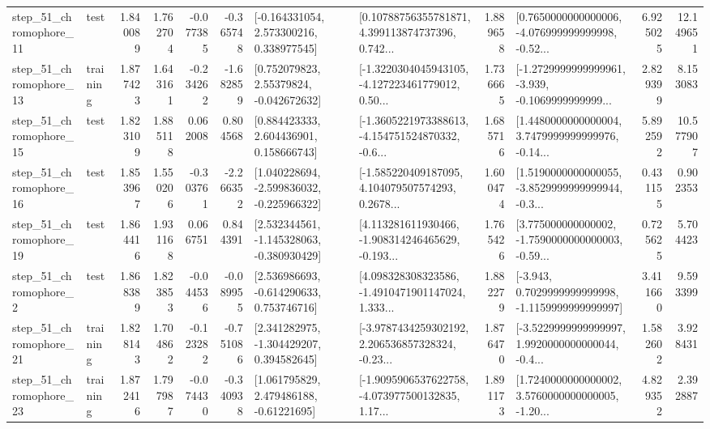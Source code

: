 \begin{tabular}{llrrrrllrlrr}
   step\_51\_chromophore\_11 &      test &      1.840089 &    1.762704 &     -0.077385 & -0.365748 &    [-0.164331054, 2.573300216, 0.338977545] &  [0.10788756355781871, 4.399113874737396, 0.742... &       1.889658 &  [0.7650000000000006, -4.076999999999998, -0.52... &            6.925025 &         12.149651 \\
   step\_51\_chromophore\_13 &  training &      1.877423 &    1.643161 &     -0.234262 & -1.682859 &     [0.752079823, 2.55379824, -0.042672632] &  [-1.3220304045943105, -4.127223461779012, 0.50... &       1.736665 &  [-1.2729999999999961, -3.939, -0.1069999999999... &            2.829399 &          8.153083 \\
   step\_51\_chromophore\_15 &      test &      1.823109 &    1.885118 &      0.062008 &  0.804568 &     [0.884423333, 2.604436901, 0.158666743] &  [-1.3605221973388613, -4.154751524870332, -0.6... &       1.685716 &  [1.4480000000000004, 3.7479999999999976, -0.14... &            5.892592 &         10.577907 \\
   step\_51\_chromophore\_16 &      test &      1.853967 &    1.550206 &     -0.303761 & -2.266352 &   [1.040228694, -2.599836032, -0.225966322] &  [-1.585220409187095, 4.104079507574293, 0.2678... &       1.600474 &  [1.5190000000000055, -3.8529999999999944, -0.3... &            0.431155 &          0.902353 \\
   step\_51\_chromophore\_19 &      test &      1.864416 &    1.931168 &      0.066751 &  0.844391 &   [2.532344561, -1.145328063, -0.380930429] &  [4.113281611930466, -1.908314246465629, -0.193... &       1.765426 &  [3.775000000000002, -1.7590000000000003, -0.59... &            0.725625 &          5.704423 \\
    step\_51\_chromophore\_2 &      test &      1.868389 &    1.823853 &     -0.044536 & -0.089955 &    [2.536986693, -0.614290633, 0.753746716] &  [4.098328308323586, -1.4910471901147024, 1.333... &       1.882279 &  [-3.943, 0.7029999999999998, -1.1159999999999997] &            3.411660 &          9.593399 \\
   step\_51\_chromophore\_21 &  training &      1.828143 &    1.704862 &     -0.123282 & -0.751086 &    [2.341282975, -1.304429207, 0.394582645] &  [-3.9787434259302192, 2.206536857328324, -0.23... &       1.876470 &  [-3.5229999999999997, 1.9920000000000044, -0.4... &            1.582602 &          3.928431 \\
   step\_51\_chromophore\_23 &  training &      1.872416 &    1.797987 &     -0.074430 & -0.340938 &     [1.061795829, 2.479486188, -0.61221695] &  [-1.9095906537622758, -4.073977500132835, 1.17... &       1.891173 &  [1.7240000000000002, 3.5760000000000005, -1.20... &            4.829352 &          2.392887 \\

\end{tabular}

